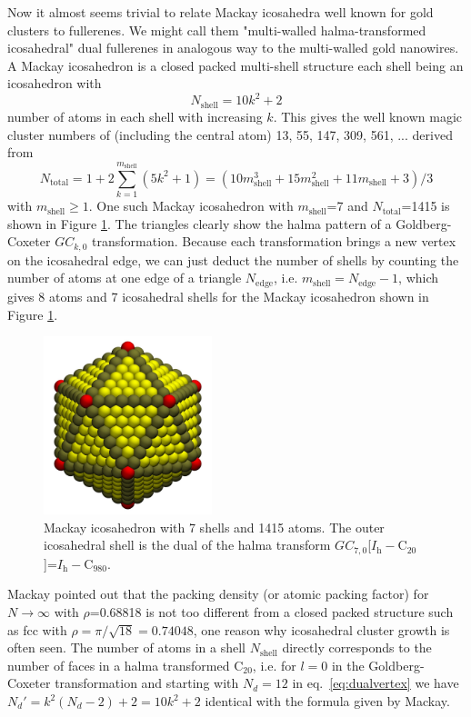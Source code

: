 Now it almost seems trivial to relate Mackay icosahedra\autocite{Mackay-1962}
well known for gold clusters\autocite{Nam2002,Wang-Wang-2011} to fullerenes. We
might call them "multi-walled halma-transformed icosahedral" dual fullerenes in
analogous way to the multi-walled gold nanowires. A Mackay icosahedron is a
closed packed multi-shell structure each shell being an icosahedron with
%
\begin{equation}
  \label{eq:mackay} 
N_\text{shell}=10k^2+2
\end{equation}
%
number of atoms in each shell with increasing $k$. This gives the well known
magic cluster numbers of (including the central atom) 13, 55, 147, 309, 561,
... derived from
%
\begin{equation}
  \label{eq:mackaytotal} 
N_\text{total}=1+2\sum_{k=1}^{m_\text{shell}}\left( 5k^2+1 \right)=(10m_\text{shell}^3+15m_\text{shell}^2+11m_\text{shell}+3)/3
\end{equation}
%
with $m_\text{shell} \ge 1$. One such Mackay icosahedron with $m_\text{shell}$=7 and
$N_\text{total}$=1415 is shown in Figure \ref{fig:mackaylarge}. The triangles
clearly show the halma pattern of a Goldberg-Coxeter $GC_{k,0}$ transformation.
Because each transformation brings a new vertex on the icosahedral edge, we can
just deduct the number of shells by counting the number of atoms at one edge of
a triangle $N_\text{edge}$, i.e. $m_\text{shell}=N_\text{edge}-1$, which gives 8 atoms and 7
icosahedral shells for the Mackay icosahedron shown in Figure \ref{fig:mackaylarge}.
%
\begin{figure}[htb]
\begin{center}
\includegraphics[width=4.9cm]{golddual/ico.jpg}
    \caption{Mackay icosahedron with 7 shells and 1415 atoms. The outer icosahedral shell is the dual of the halma transform $GC_{7,0}$[$I_\mathrm{h}-$C$_{20}$]=$I_\mathrm{h}-$C$_{980}$.}
\label{fig:mackaylarge}
\end{center}
\end{figure}
%
Mackay pointed out that the packing density (or atomic packing factor) for $N
\rightarrow \infty$ with $\rho$=0.68818 is not too different from a closed
packed structure such as fcc with
$\rho=\pi/\sqrt{18}=0.74048$,\autocite{Mackay-1962} one reason why icosahedral
cluster growth is often seen. The number of atoms in a shell $N_\text{shell}$
directly corresponds to the number of faces in a halma transformed C$_{20}$,
i.e. for $l=0$ in the Goldberg-Coxeter transformation and starting with
$N_d=12$ in eq.~\ref{eq:dualvertex} we have $N_d'=k^2(N_d-2)+2 = 10k^2+2$
identical with the formula given by Mackay. 

